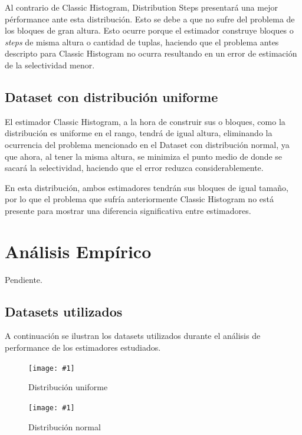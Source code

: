 \documentclass[a4paper, 10pt, twoside]{article}
\newcommand{\grafico}[3]{
  \begin{figure}[H]
    \texttt{[image: \#1]}
    \caption{#2}
    \label{#3}
  \end{figure}
}
\begin{document}
Al contrario de Classic Histogram, Distribution Steps presentará una mejor pérformance ante esta distribución. Esto se debe a que no sufre del problema
de los bloques de gran altura. Esto ocurre porque el estimador construye bloques o \textit{steps} de misma altura o cantidad de tuplas, haciendo que el problema 
antes descripto para Classic Histogram no ocurra resultando en un error de estimación de la selectividad menor.

\subsection{Dataset con distribución uniforme}
El estimador Classic Histogram, a la hora de construir sus  o bloques, como la distribución es uniforme en el rango, tendrá 
de igual altura, eliminando la ocurrencia del problema mencionado en el Dataset con distribución normal, ya que ahora, al tener la misma altura, se minimiza
el punto medio de donde se sacará la selectividad, haciendo que el error reduzca considerablemente.

En esta distribución, ambos estimadores tendrán sus bloques de igual tamaño, por lo que el problema que sufría anteriormente Classic Histogram no está
presente para mostrar una diferencia significativa entre estimadores.




\section{Análisis Empírico}

Pendiente.


\subsection{Datasets utilizados}

A continuación se ilustran los datasets utilizados durante el análisis de performance de los estimadores estudiados.

\grafico{custom-dataset-uniform}
        {Distribución uniforme}
        {custom-dataset-uniform}

\grafico{custom-dataset-normal}
        {Distribución normal}
        {custom-dataset-normal}
\end{document}
